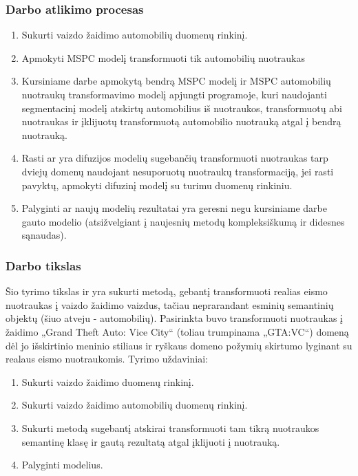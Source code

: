 \documentclass{VUMIFPSbakalaurinis}
\begin{document}
    \subsubsection*{Darbo atlikimo procesas}
        \begin{enumerate}
            \item Sukurti vaizdo žaidimo automobilių duomenų rinkinį.
            \item Apmokyti MSPC modelį transformuoti tik automobilių nuotraukas
            \item Kursiniame darbe apmokytą bendrą MSPC modelį ir MSPC automobilių nuotraukų transformavimo modelį apjungti programoje, kuri naudojanti segmentacinį modelį atskirtų automobilius iš nuotraukos, transformuotų abi nuotraukas ir įklijuotų transformuotą automobilio nuotrauką atgal į bendrą nuotrauką. 
            \item Rasti ar yra difuzijos modelių sugebančių transformuoti nuotraukas tarp dviejų domenų naudojant nesuporuotų nuotraukų transformaciją, jei rasti pavyktų, apmokyti difuzinį modelį su turimu duomenų rinkiniu.  
            \item Palyginti ar naujų modelių rezultatai yra geresni negu kursiniame darbe gauto modelio (atsižvelgiant į naujesnių metodų kompleksiškumą ir didesnes sąnaudas).
        \end{enumerate}

    \subsubsection*{Darbo tikslas}
        Šio tyrimo tikslas ir yra sukurti metodą, gebantį transformuoti realias eismo nuotraukas į vaizdo žaidimo vaizdus, tačiau neprarandant esminių semantinių objektų (šiuo atveju - automobilių). Pasirinkta buvo transformuoti nuotraukas į  žaidimo „Grand Theft Auto: Vice City“ (toliau trumpinama „GTA:VC“) domeną dėl jo išskirtinio meninio stiliaus ir ryškaus domeno požymių skirtumo lyginant su realaus eismo nuotraukomis. Tyrimo uždaviniai:
        \begin{enumerate}
            \item Sukurti vaizdo žaidimo duomenų rinkinį.
            \item Sukurti vaizdo žaidimo automobilių duomenų rinkinį.
            \item Sukurti metodą sugebantį atskirai transformuoti tam tikrą nuotraukos semantinę klasę ir gautą rezultatą atgal įklijuoti į nuotrauką. 
            \item Palyginti modelius.
        \end{enumerate}

        \nocite{*}

\printbibliography[heading=bibintoc]
\end{document}
